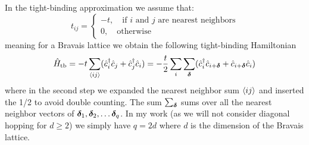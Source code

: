\documentclass[11pt, a4paper]{article}
\theoremstyle{definition} %
\newcommand{\vc}{\vb*}
\begin{document}
	In the tight-binding approximation we assume that:
	\begin{equation}
		t_{ij} = \begin{cases}
 			-t, \quad \text{if $i$ and $j$ are nearest neighbors} \\
 			0, \quad \text{otherwise}
		 \end{cases}
	\end{equation}
	meaning for a Bravais lattice we obtain the following tight-binding Hamiltonian
	\begin{equation}
		\hat{H}_{\text{tb}} = - t \sum_{\expval{ij}} ( \hat{c}_{i}^\dagger \hat{c}_j + \hat{c}_j^\dagger \hat{c}_i) = -\frac{t}{2} \sum_{i}\sum_{\vc{\delta}} (\hat{c}_i^\dagger \hat{c}_{i + \vc{\delta}} + \hat{c}_{i + \vc{\delta}} \hat{c}_i)
	\end{equation}
	where in the second step we expanded the nearest neighbor sum $\expval{ij}$ and inserted the 1/2 to avoid double counting. The sum $\sum_{\vc{\delta}}$ sums over all the nearest neighbor vectors of $\vc{\delta}_1, \vc{\delta}_2, \dots \vc{\delta}_q$. In my work (as we will not consider diagonal hopping for $d \geq 2$) we simply have $q = 2d$ where $d$ is the dimension of the Bravais lattice. \\
	
\end{document}
